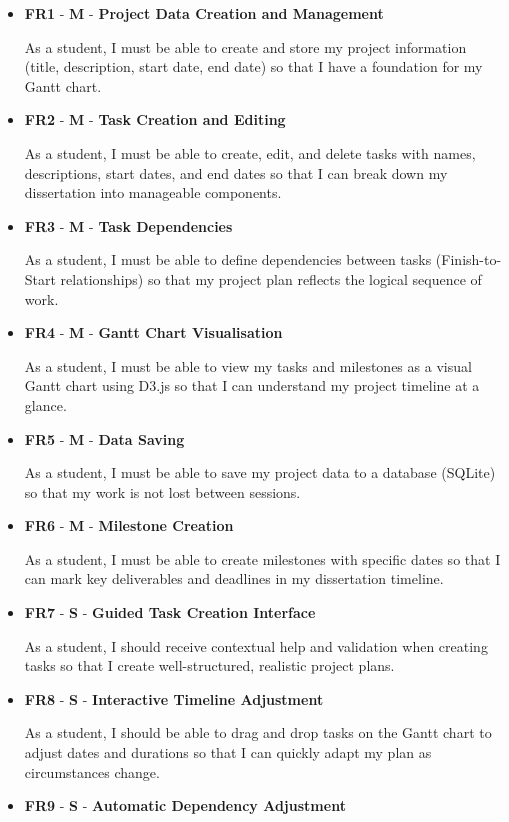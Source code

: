 \documentclass[12pt,nonacm,acmlarge,titlepage,screen]{acmart}
\begin{document}
\begin{itemize}

    \item	\textbf{	FR1	}	-	\textbf{	M	}	-	\textbf{	Project Data Creation and Management	}		
    
    As a student, I must be able to create and store my project information (title, description, start date, end date) so that I have a foundation for my Gantt chart.
    \item	\textbf{	FR2	}	-	\textbf{	M	}	-	\textbf{	Task Creation and Editing	}		
    
    As a student, I must be able to create, edit, and delete tasks with names, descriptions, start dates, and end dates so that I can break down my dissertation into manageable components.
    \item	\textbf{	FR3	}	-	\textbf{	M	}	-	\textbf{	Task Dependencies	}		
   
    As a student, I must be able to define dependencies between tasks (Finish-to-Start relationships) so that my project plan reflects the logical sequence of work.
    \item	\textbf{	FR4	}	-	\textbf{	M	}	-	\textbf{	Gantt Chart Visualisation	}		
    
    As a student, I must be able to view my tasks and milestones as a visual Gantt chart using D3.js so that I can understand my project timeline at a glance.
    \item	\textbf{	FR5	}	-	\textbf{	M	}	-	\textbf{	Data Saving	}		
    
    As a student, I must be able to save my project data to a database (SQLite) so that my work is not lost between sessions.
    \item	\textbf{	FR6	}	-	\textbf{	M	}	-	\textbf{	Milestone Creation	}		
    
    As a student, I must be able to create milestones with specific dates so that I can mark key deliverables and deadlines in my dissertation timeline.
    \item	\textbf{	FR7	}	-	\textbf{	S	}	-	\textbf{	Guided Task Creation Interface	}		
    
    As a student, I should receive contextual help and validation when creating tasks so that I create well-structured, realistic project plans.
    \item	\textbf{	FR8	}	-	\textbf{	S	}	-	\textbf{	Interactive Timeline Adjustment	}		
    
    As a student, I should be able to drag and drop tasks on the Gantt chart to adjust dates and durations so that I can quickly adapt my plan as circumstances change.
    \item	\textbf{	FR9	}	-	\textbf{	S	}	-	\textbf{	Automatic Dependency Adjustment	}		
    

\end{itemize}
\end{document}
